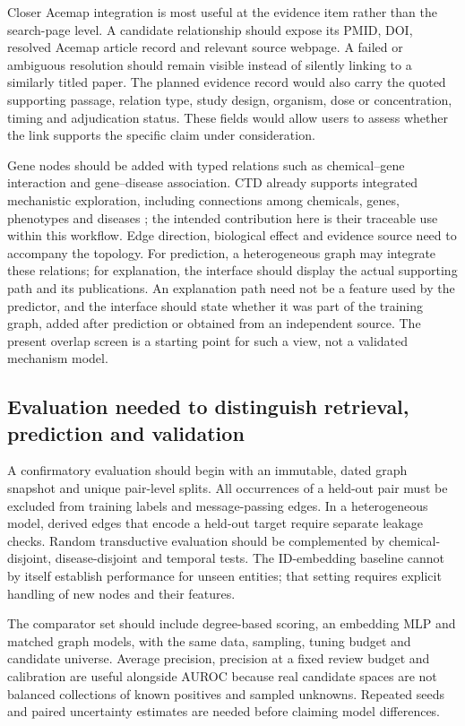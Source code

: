 Closer Acemap integration is most useful at the evidence item rather than the search-page level. A candidate relationship should expose its PMID, DOI, resolved Acemap article record and relevant source webpage. A failed or ambiguous resolution should remain visible instead of silently linking to a similarly titled paper. The planned evidence record would also carry the quoted supporting passage, relation type, study design, organism, dose or concentration, timing and adjudication status. These fields would allow users to assess whether the link supports the specific claim under consideration.

Gene nodes should be added with typed relations such as chemical--gene interaction and gene--disease association. CTD already supports integrated mechanistic exploration, including connections among chemicals, genes, phenotypes and diseases \citep{ctd2023}; the intended contribution here is their traceable use within this workflow. Edge direction, biological effect and evidence source need to accompany the topology. For prediction, a heterogeneous graph may integrate these relations; for explanation, the interface should display the actual supporting path and its publications. An explanation path need not be a feature used by the predictor, and the interface should state whether it was part of the training graph, added after prediction or obtained from an independent source. The present overlap screen is a starting point for such a view, not a validated mechanism model.

\subsection{Evaluation needed to distinguish retrieval, prediction and validation}
A confirmatory evaluation should begin with an immutable, dated graph snapshot and unique pair-level splits. All occurrences of a held-out pair must be excluded from training labels and message-passing edges. In a heterogeneous model, derived edges that encode a held-out target require separate leakage checks. Random transductive evaluation should be complemented by chemical-disjoint, disease-disjoint and temporal tests. The ID-embedding baseline cannot by itself establish performance for unseen entities; that setting requires explicit handling of new nodes and their features.

The comparator set should include degree-based scoring, an embedding MLP and matched graph models, with the same data, sampling, tuning budget and candidate universe. Average precision, precision at a fixed review budget and calibration are useful alongside AUROC because real candidate spaces are not balanced collections of known positives and sampled unknowns. Repeated seeds and paired uncertainty estimates are needed before claiming model differences.

